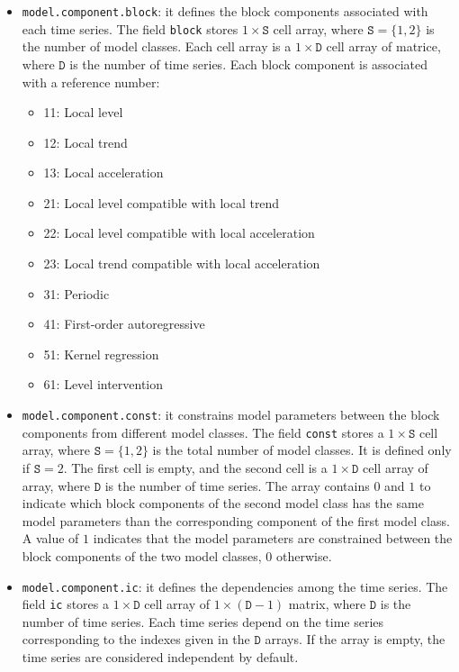 \begin{itemize}

\item \lstinline[basicstyle = \mlttfamily \small ]!model.component.block!: it defines the block components associated with each time series.
The field \lstinline[basicstyle = \mlttfamily \small ]!block! stores $1\times \mathtt{S}$ cell array, where $\mathtt{S} = \{1,2 \}$ is the number of model classes.
Each cell array is a $1\times \mathtt{D}$ cell array of matrice, where $\mathtt{D}$ is the number of time series.
Each block component is associated with a reference number:
\begin{itemize}
\item 11: Local level 
\item 12: Local trend
\item 13: Local acceleration
\item 21: Local level compatible with local trend
\item 22: Local level compatible with local acceleration
\item 23: Local trend compatible with local acceleration
\item 31: Periodic
\item 41: First-order autoregressive
\item 51: Kernel regression
\item 61: Level intervention
\end{itemize}

\item  \lstinline[basicstyle = \mlttfamily \small ]!model.component.const!: it constrains model parameters between the block components from different model classes.
The field \lstinline[basicstyle = \mlttfamily \small ]!const! stores a $1\times \mathtt{S}$ cell array, where $\mathtt{S} = \{1, 2 \}$ is the total number of model classes.
It is defined only if $\mathtt{S} = 2$.
The first cell is empty, and the second cell is a $1\times \mathtt{D}$ cell array of array, where $\mathtt{D}$ is the number of time series.
The array contains $0$ and $1$ to indicate which block components of the second model class has the same model parameters than the corresponding component of the first model class. 
A value of $1$ indicates that the model parameters are constrained between the block components of the two model classes, $0$ otherwise.

\item  \lstinline[basicstyle = \mlttfamily \small ]!model.component.ic!:  it defines the dependencies among the time series.
The field \lstinline[basicstyle = \mlttfamily \small ]!ic! stores a $1\times \mathtt{D}$ cell array of $1\times (\mathtt{D}-1)$ matrix, where $\mathtt{D}$ is the number of time series.
Each time series depend on the time series corresponding to the indexes given in the $\mathtt{D}$ arrays.
If the array is empty, the time series are considered independent by default.

\end{itemize}



